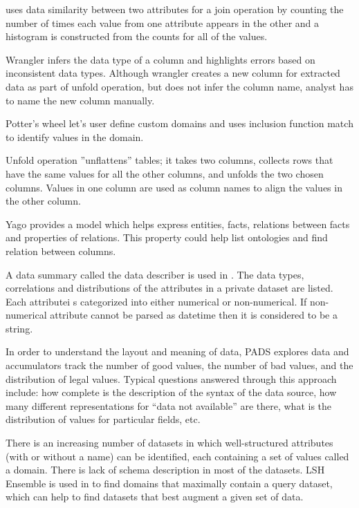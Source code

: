 \cite{nandi2013gestural} uses data similarity between two attributes for a join operation by counting the number of times each value from one attribute appears in the other and a histogram is constructed from the counts for all of the values.

Wrangler \cite{kandel2011wrangler} infers the data type of a column and highlights errors based on inconsistent data types. Although wrangler creates a new column for extracted data as part of unfold operation, but does not infer the column name, analyst has to name the new column manually.

Potter's wheel \cite{raman2001potter} let's user define custom domains and uses inclusion function match to identify values in the domain.

Unfold operation ”unflattens” tables; it takes two columns, collects rows that have the same values for all the other columns, and unfolds the two chosen columns. Values in one column are used as column names to align the values in the other column.

Yago \cite{fabian2007yago} provides a model which helps express entities, facts, relations between facts and properties of relations. This property could help list ontologies and find relation between columns.

A data summary called the data describer is used in \cite{ping2017datasynthesizer}. The data types, correlations and distributions of the attributes in a private dataset are listed. Each attributei s categorized into either numerical or non-numerical. If non-numerical attribute cannot be parsed as datetime then it is considered to be a string. 

In order to understand the layout and meaning of data, PADS \cite{fisher2005pads} explores data and accumulators track
the number of good values, the number of bad values, and the distribution
of legal values. Typical questions answered through this approach include: how complete is the description of the syntax of the data source, how many different representations for “data not available” are there, what is the distribution of values for particular fields, etc.


There is an increasing number of datasets in which well-structured attributes
(with or without a name) can be identified, each containing a set of values called a domain. There is lack of schema description in most of the datasets.
LSH Ensemble is used in \cite{zhu2016lsh} to find domains that maximally contain a query dataset, which can help to find datasets that best augment a given set of data.